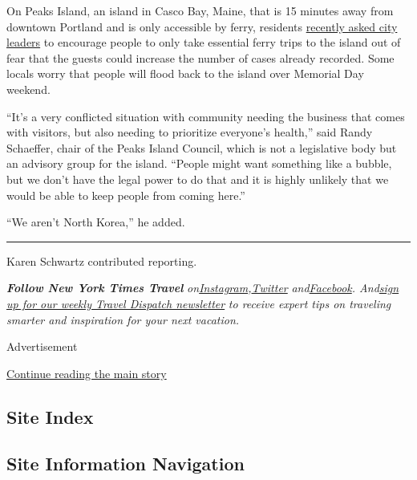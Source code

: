 On Peaks Island, an island in Casco Bay, Maine, that is 15 minutes away
from downtown Portland and is only accessible by ferry, residents
\href{https://www.wmtw.com/article/islanders-ask-people-only-make-essential-trips-for-now/32010258}{recently
asked city leaders} to encourage people to only take essential ferry
trips to the island out of fear that the guests could increase the
number of cases already recorded. Some locals worry that people will
flood back to the island over Memorial Day weekend.

``It's a very conflicted situation with community needing the business
that comes with visitors, but also needing to prioritize everyone's
health,'' said Randy Schaeffer, chair of the Peaks Island Council, which
is not a legislative body but an advisory group for the island. ``People
might want something like a bubble, but we don't have the legal power to
do that and it is highly unlikely that we would be able to keep people
from coming here.''

``We aren't North Korea,'' he added.

\begin{center}\rule{0.5\linewidth}{\linethickness}\end{center}

Karen Schwartz contributed reporting.

\emph{\textbf{Follow New York Times Travel}}
\emph{on}\href{https://www.instagram.com/nytimestravel/}{\emph{Instagram}}\emph{,}\href{https://twitter.com/nytimestravel}{\emph{Twitter}}
\emph{and}\href{https://www.facebookcorewwwi.onion/nytimestravel/}{\emph{Facebook}}\emph{.
And}\href{https://www.nytimes3xbfgragh.onion/newsletters/traveldispatch}{\emph{sign
up for our weekly Travel Dispatch newsletter}} \emph{to receive expert
tips on traveling smarter and inspiration for your next vacation.}

Advertisement

\protect\hyperlink{after-bottom}{Continue reading the main story}

\hypertarget{site-index}{%
\subsection{Site Index}\label{site-index}}

\hypertarget{site-information-navigation}{%
\subsection{Site Information
Navigation}\label{site-information-navigation}}

